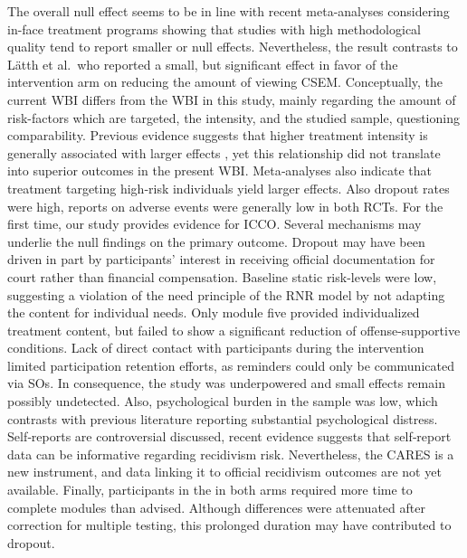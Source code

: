 \documentclass[
  super,
  preprint,
  1p,
  onecolumn]{elsarticle}
\begin{document}
The overall null effect seems to be in line with recent meta-analyses
considering in-face treatment programs showing that studies with high
methodological quality tend to report smaller or null effects.
\citep{holperModeratorsSexualRecidivism2024, olverSexualOffenseTreatment2025}
Nevertheless, the result contrasts to Lätth et al.~who reported a small,
but significant effect in favor of the intervention arm on reducing the
amount of viewing CSEM.
\citep{latthEffectsInternetdeliveredCognitive2022} Conceptually, the
current WBI differs from the WBI in this study, mainly regarding the
amount of risk-factors which are targeted, the intensity, and the
studied sample, questioning comparability. Previous evidence suggests
that higher treatment intensity is generally associated with larger
effects \citep{olverSexualOffenseTreatment2025}, yet this relationship
did not translate into superior outcomes in the present WBI.
Meta‑analyses also indicate that treatment targeting high‑risk
individuals yield larger effects.
\citep{holperModeratorsSexualRecidivism2024, olverSexualOffenseTreatment2025}
Also dropout rates were high, reports on adverse events were generally
low in both RCTs. For the first time, our study provides evidence for
ICCO. Several mechanisms may underlie the null findings on the primary
outcome. Dropout may have been driven in part by participants' interest
in receiving official documentation for court rather than financial
compensation. Baseline static risk-levels were low, suggesting a
violation of the need principle of the RNR model by not adapting the
content for individual needs. \citep{bontaPsychologyCriminalConduct2023}
Only module five provided individualized treatment content, but failed
to show a significant reduction of offense-supportive conditions. Lack
of direct contact with participants during the intervention limited
participation retention efforts, as reminders could only be communicated
via SOs. In consequence, the study was underpowered and small effects
remain possibly undetected. Also, psychological burden in the sample was
low, which contrasts with previous literature reporting substantial
psychological distress.
\citep{chronosTreatmentNeedsExperiences2024, latthChildSexualAbuse2025}
Self‑reports are controversial discussed, recent evidence suggests that
self‑report data can be informative regarding recidivism risk.
\citep{mcmahanPredictiveAbilitySexual2026} Nevertheless, the CARES is a
new instrument, and data linking it to official recidivism outcomes are
not yet available.
\citep{sonjaetzlerDevelopmentInitialValidationsubmitted} Finally,
participants in the in both arms required more time to complete modules
than advised. Although differences were attenuated after correction for
multiple testing, this prolonged duration may have contributed to
dropout.
\end{document}
